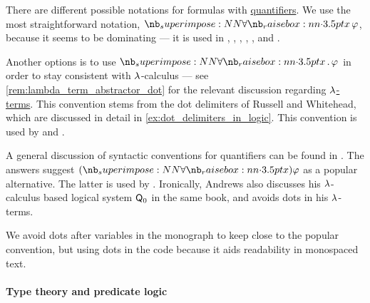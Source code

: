 \begin{remark}\label{rem:notation_for_quantifiers}
  There are different possible notations for formulas with \hyperref[def:predicate_logic_alphabet/quantifiers]{quantifiers}. We use the most straightforward notation, \( \qforall x \varphi \), because it seems to be dominating --- it is used in
  \cite[ch. 2]{Hinman2005Logic},
  \cite[ch. II]{Kleene2002Logic},
  \cite[ch. IV]{Smullyan1995FOL},
  \cite[\S I.9]{КолмогоровДрагалин2006Логика},
  \cite[def. 2.1.6]{Герасимов2011Вычислимость},
  \cite[ch. 3]{ШеньВерещагин2017ЯзыкиИИсчисления} and
  \cite[ch. II]{Эдельман1975Логика}.

  Another options is to use \( \quantifier* \synforall x \varphi \) in order to stay consistent with \( {\mathrm \lambda} \)-calculus --- see \cref{rem:lambda_term_abstractor_dot} for the relevant discussion regarding \hyperref[def:lambda_term]{\( {\mathrm \lambda} \)-terms}. This convention stems from the dot delimiters of Russell and Whitehead, which are discussed in detail in \cref{ex:dot_delimiters_in_logic}. This convention is used by  and .

  A general discussion of syntactic conventions for quantifiers can be found in \cite{MathSE:standards_for_quantifier_notation}. The answers suggest \( (\synforall x) \varphi \) as a popular alternative. The latter is used by . Ironically, Andrews also discusses his \( {\mathrm \lambda} \)-calculus based logical system \hyperref[rem:simply_typed_hol]{\( \textsf{\upshape Q}_0 \)} in the same book, and avoids dots in his \( {\mathrm \lambda} \)-terms.

  We avoid dots after variables in the monograph to keep close to the popular convention, but using dots in the code because it aids readability in monospaced text.
\end{remark}

\paragraph{Type theory and predicate logic}

